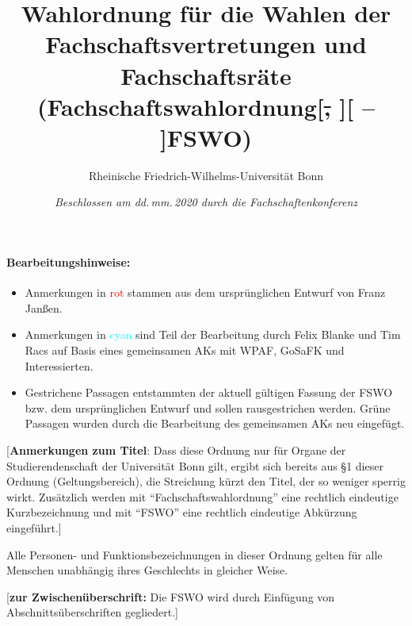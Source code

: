 \documentclass[%
draft,%
multilinesections%
]{fswo}
\newcommand\oldT[1]  {{\color{Gray}[\st{#1}]}}
\newcommand\newT[1]  {{\color{Green}[#1]}}
\newcommand\bemFr[1] {{\color{Red}[#1]}}
\newcommand\oldT[1]{}%
\newcommand\newT[1]{#1}
\newcommand\bemFr[1]{}%
\newcommand\change[2]{\oldT{#1}\newT{#2}}
\begin{document}
\title{Wahlordnung für die Wahlen der Fachschaftsvertretungen und Fachschaftsräte\\
(Fachschaftswahlordnung\change{, }{ -- }FSWO)}
\subtitle{Rheinische Friedrich-Wilhelms-Universität Bonn}
\author{}
\date{{\itshape\normalsize%
  Beschlossen am dd.\,mm.\,2020 durch die Fachschaftenkonferenz}}
\publishers{\itshape\normalsize%
  sowie am dd.\,mm.\,2020 durch das Studierendenparlament.}

\maketitle

\makeatletter
\ifFK@draft
\paragraph{Bearbeitungshinweise:}
\begin{itemize}
\item Anmerkungen in \textcolor{Red}{rot} stammen aus dem ursprünglichen Entwurf von Franz Janßen.
\item Anmerkungen in \textcolor{Cyan}{cyan} sind Teil der Bearbeitung durch Felix Blanke und Tim Racs auf Basis eines gemeinsamen AKs mit WPAF, GoSaFK und Interessierten.
\item Gestrichene Passagen entstammten der aktuell gültigen Fassung der FSWO bzw. dem ursprünglichen Entwurf und sollen rausgestrichen werden. Grüne Passagen wurden durch die Bearbeitung des gemeinsamen AKs neu eingefügt.
\end{itemize}
\fi
\makeatother

\bemFr{\textbf{Anmerkungen zum Titel}: Dass diese Ordnung nur für Organe der Studierendenschaft der Universität Bonn gilt, ergibt sich bereits aus \S 1 dieser Ordnung (Geltungsbereich), die Streichung kürzt den Titel, der so weniger sperrig wirkt. Zusätzlich werden mit \enquote{Fachschaftswahlordnung} eine rechtlich eindeutige Kurzbezeichnung und mit \enquote{FSWO} eine rechtlich eindeutige Abkürzung eingeführt.}
%
\begingroup
\endgroup

Alle Personen- und Funktionsbezeichnungen in dieser Ordnung gelten für alle Menschen unabhängig ihres Geschlechts in gleicher Weise.

\bemFr{\textbf{zur Zwischenüberschrift:} Die FSWO wird durch Einfügung von Abschnittsüberschriften gegliedert.}
\end{document}
